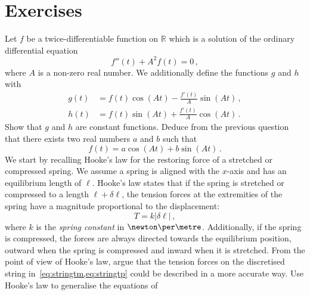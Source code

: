 \section{Exercises}
\begin{ExerciseList}
  \Exercise[label=odesincos] Let $f$ be a twice-differentiable function on $\mathbb{R}$ which is
  a solution of the ordinary differential equation
  \begin{equation}
    f''(t) + A^2 f(t) = 0\,,
  \end{equation}
  where $A$ is a non-zero real number. We additionally define the functions $g$ and $h$
  with
  \begin{align}
    g(t)&=f(t)\cos(At)-\frac{f'(t)}{A}\sin(At)\label{eq:csgdef}\,,\\
    h(t)&=f(t)\sin(At)+\frac{f'(t)}{A}\cos(At)\label{eq:cshdef}\,.
  \end{align}
  \Question Show that $g$ and $h$ are constant functions.
  \Question Deduce from the previous question that there exists two real numbers $a$ and $b$
  such that
  \begin{equation}
    f(t)=a\cos(At)+b\sin(At)\,.\label{eq:csfsol}
  \end{equation}
  \Exercise[label=stringhooke] We start by recalling Hooke's law for the restoring force
  of a stretched or compressed spring. We assume a spring is aligned with the $x$-axis and
  has an equilibrium length of $\ell$. Hooke's law states that if the spring is stretched
  or compressed to a length $\ell+\delta\ell$, the tension forces at the extremities of
  the spring have a magnitude proportional to the displacement:
  \begin{equation}
    T=k|\delta\ell|\,,
  \end{equation}
  where $k$ is the \emph{spring constant} in $\newton\per\metre$. Additionally, if the
  spring is compressed, the forces are always directed towards the equilibrium position,
  \ie outward when the spring is compressed and inward when it is stretched. \Question
  From the point of view of Hooke's law, argue that the tension forces on the discretised
  string in~\cref{eq:stringtm,eq:stringtp} could be described in a more accurate way.
  \Question Use Hooke's law to generalise the equations of

\end{ExerciseList}
